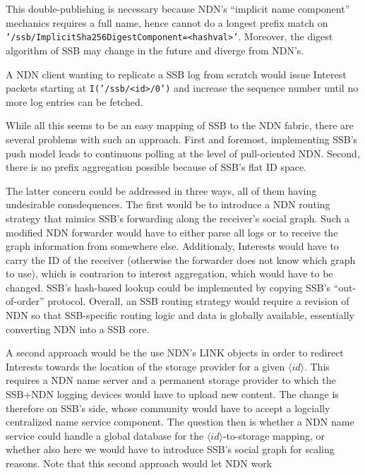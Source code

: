 \documentclass[sigconf]{acmart}
\begin{document}
\noindent
This double-publishing is necessary because NDN's ``implicit name
component'' mechanics requires a full name, hence cannot do a longest
prefix match on {\tt
  '/ssb/ImplicitSha256DigestComponent=<hashval>'}. Moreover, the digest
algorithm of SSB may change in the future and diverge from NDN's.

A NDN client wanting to replicate a SSB log from scratch would issue
Interest packets starting at {\tt I('/ssb/<id>/0')} and increase the
sequence number until no more log entries can be fetched.

While all this seems to be an easy mapping of SSB to the NDN fabric, there
are several problems with such an approach. First and foremost,
implementing SSB's push model leads to continuous polling at the level
of pull-oriented NDN. Second, there is no prefix aggregation possible
because of SSB's flat ID space.

The latter concern could be addressed in three ways, all of them
having undesirable consdequences. The first would be to introduce a
NDN routing strategy that mimics SSB's forwarding along the receiver's
social graph. Such a modified NDN forwarder would have to either parse
all logs or to receive the graph information from somewhere
else. Additionaly, Interests would have to carry the ID of the
receiver (otherwise the forwarder does not know which graph to use),
which is contrarion to interest aggregation, which would have to be
changed.  SSB's hash-based lookup could be implemented by copying
SSB's ``out-of-order'' protocol. Overall, an SSB routing strategy
would require a revision of NDN so that SSB-specific routing logic and
data is globally available, essentially converting NDN into a SSB core.

A second approach would be the use NDN's LINK objects in order to
redirect Interests towards the location of the storage provider for a
given $\langle id\rangle$. This requires a NDN name server and a
permanent storage provider to which the SSB+NDN logging devices would
have to upload new content. The change is therefore on SSB's side,
whose community would have to accept a logcially centralized name
service component. The question then is whether a NDN name service
could handle a global database for the $\langle id\rangle$-to-storage
mapping, or whether also here we would have to introduce SSB's social
graph for scaling reasons. Note that this second approach would let NDN work
\end{document}
